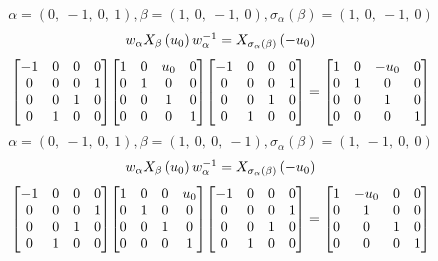 \documentclass[11pt]{article}
\theoremstyle{definition}
\begin{document}
\[
\alpha = \left( 0, \  -1, \  0, \  1\right), \beta = \left( 1, \  0, \  -1, \  0\right), \sigma_{\alpha}(\beta) = \left( 1, \  0, \  -1, \  0\right)
\]
\[
\scaletoalign{\textwidth}{w_{\alpha} X_{\beta}\left(u_{0}\right) w_{\alpha}^{-1} = X_{\sigma_{\alpha}\left(\beta\right)}\left(- u_{0}\right)}
\]
\[
\scaletoalign{\textwidth}{{\left[\begin{matrix}-1 & 0 & 0 & 0\\0 & 0 & 0 & 1\\0 & 0 & 1 & 0\\0 & 1 & 0 & 0\end{matrix}\right]} {\left[\begin{matrix}1 & 0 & u_{0} & 0\\0 & 1 & 0 & 0\\0 & 0 & 1 & 0\\0 & 0 & 0 & 1\end{matrix}\right]} {\left[\begin{matrix}-1 & 0 & 0 & 0\\0 & 0 & 0 & 1\\0 & 0 & 1 & 0\\0 & 1 & 0 & 0\end{matrix}\right]} = {\left[\begin{matrix}1 & 0 & - u_{0} & 0\\0 & 1 & 0 & 0\\0 & 0 & 1 & 0\\0 & 0 & 0 & 1\end{matrix}\right]}}
\]
\[
\alpha = \left( 0, \  -1, \  0, \  1\right), \beta = \left( 1, \  0, \  0, \  -1\right), \sigma_{\alpha}(\beta) = \left( 1, \  -1, \  0, \  0\right)
\]
\[
\scaletoalign{\textwidth}{w_{\alpha} X_{\beta}\left(u_{0}\right) w_{\alpha}^{-1} = X_{\sigma_{\alpha}\left(\beta\right)}\left(- u_{0}\right)}
\]
\[
\scaletoalign{\textwidth}{{\left[\begin{matrix}-1 & 0 & 0 & 0\\0 & 0 & 0 & 1\\0 & 0 & 1 & 0\\0 & 1 & 0 & 0\end{matrix}\right]} {\left[\begin{matrix}1 & 0 & 0 & u_{0}\\0 & 1 & 0 & 0\\0 & 0 & 1 & 0\\0 & 0 & 0 & 1\end{matrix}\right]} {\left[\begin{matrix}-1 & 0 & 0 & 0\\0 & 0 & 0 & 1\\0 & 0 & 1 & 0\\0 & 1 & 0 & 0\end{matrix}\right]} = {\left[\begin{matrix}1 & - u_{0} & 0 & 0\\0 & 1 & 0 & 0\\0 & 0 & 1 & 0\\0 & 0 & 0 & 1\end{matrix}\right]}}
\]
\end{document}
